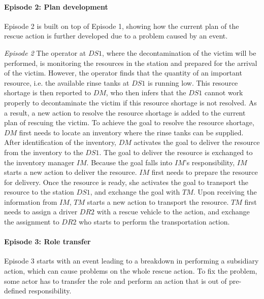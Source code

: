 \paragraph*{Episode 2: Plan development} %
\label{par:episode_2_plan_development}
Episode 2 is built on top of Episode 1, showing how the current plan of the rescue action is further developed due to a problem caused by an event.

\begin{scenario}
\footnotesize
\emph{Episode 2} The operator at $DS1$, where the decontamination of the victim will be performed, is monitoring the resources in the station and prepared for the arrival of the victim. However, the operator finds that the quantity of an important resource, i.e. the available rinse tanks at $DS1$ is running low. This resource shortage is then reported to $DM$, who then infers that the $DS1$ cannot work properly to decontaminate the victim if this resource shortage is not resolved. As a result, a new action to resolve the resource shortage is added to the current plan of rescuing the victim. To achieve the goal to resolve the resource shortage, $DM$ first needs to locate an inventory where the rinse tanks can be supplied. After identification of the inventory, $DM$ activates the goal to deliver the resource from the inventory to the $DS1$. The goal to deliver the resource is exchanged to the inventory manager $IM$. Because the goal falls into $IM$'s responsibility, $IM$ starts a new action to deliver the resource. $IM$ first needs to prepare the resource for delivery. Once the resource is ready, she activates the goal to transport the resource to the station $DS1$, and exchange the goal with $TM$. Upon receiving the information from $IM$, $TM$ starts a new action to transport the resource. $TM$ first needs to assign a driver $DR2$ with a rescue vehicle to the action, and exchange the assignment to $DR2$ who starts to perform the transportation action.
\end{scenario}

\paragraph*{Episode 3: Role transfer} %
\label{par:episode_3_role_transfer}
Episode 3 starts with an event leading to a breakdown in performing a subsidiary action, which can cause problems on the whole rescue action. To fix the problem, some actor has to transfer the role and perform an action that is out of pre-defined responsibility.

